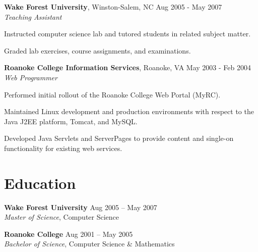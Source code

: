 \documentclass[margin,line]{resume}
\begin{document}
\begin{resume}
  \textbf{Wake Forest University}, Winston-Salem, NC \hfill Aug 2005 - May 2007\vspace{1mm}\\
  \textsl{Teaching Assistant}\\
  \vspace{-3mm}
  \begin{list2}
  \item Instructed computer science lab and tutored students in
    related subject matter.
  \item Graded lab exercises, course assignments, and examinations.
  \end{list2}

  \textbf{Roanoke College Information Services}, Roanoke, VA \hfill May 2003 - Feb 2004\vspace{1mm}\\
  \textsl{Web Programmer}\\
  \vspace{-3mm}
  \begin{list2}
  \item Performed initial rollout of the Roanoke College Web Portal (MyRC).
  \item Maintained Linux development and production environments with
    respect to the Java J2EE platform, Tomcat, and MySQL.
  \item Developed Java Servlets and ServerPages to provide content and
    single-on functionality for existing web services.
  \end{list2}



  \section{\mysidestyle \textcolor{mySideColor}{Education}}

  \textbf{Wake Forest University}\vspace{2mm} \hfill Aug 2005 -- May 2007\\
  \textsl{Master of Science}, Computer Science\vspace{-1mm}

  \textbf{Roanoke College}\vspace{2mm} \hfill Aug 2001 -- May 2005\\
  \textsl{Bachelor of Science}, Computer Science \& Mathematics\vspace{-1mm}



\end{resume}
\end{document}
